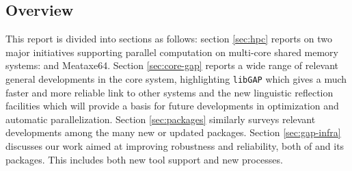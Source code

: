 \subsection{Overview}
This report is divided into sections as follows: 
section \ref{sec:hpc} reports on two major initiatives supporting
parallel computation on multi-core shared memory
systems: \HPCGAP and Meataxe64. Section  \ref{sec:core-gap}
reports a wide range of relevant general developments in the core \GAP
system, highlighting \texttt{libGAP} which gives a much faster and
more reliable link to other systems and the new linguistic reflection
facilities which will provide a basis for future developments in
optimization and automatic parallelization. Section \ref{sec:packages}
similarly surveys relevant developments among the many new or updated packages.
Section \ref{sec:gap-infra} discusses our work aimed at improving
robustness and reliability, both of \GAP and its packages. This
includes both new tool support and new processes. 

